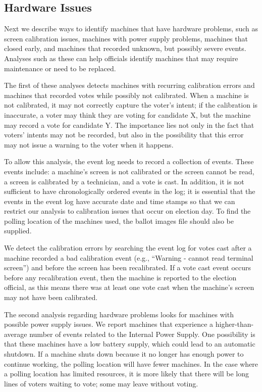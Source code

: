 \subsection{Hardware Issues}
\smvertspace
Next we describe ways to identify machines that have hardware problems, such as
screen calibration issues, machines with power supply problems, machines that
closed early, and machines that recorded unknown, but possibly severe events.
Analyses such as these can help officials identify machines that may require
maintenance or need to be replaced.  

The first of these analyses detects machines with recurring calibration errors
and machines that recorded votes while possibly not calibrated.  When
a machine is not calibrated, it may not
correctly capture the voter's intent; if the calibration is inaccurate, a voter
may think they are voting for candidate X, but the machine may record a vote for
candidate Y.  The importance lies not only in the fact that voters' intents may
not be recorded, but also in the possibility that this error may not issue a
warning to the voter when it happens.   

To allow this analysis, the event log needs to record a collection of
events. These events include: a machine's screen is not calibrated or
the screen cannot be read, a screen is calibrated by a technician, and
a vote is cast.  In addition, it is not sufficient to have
chronologically ordered events in the log; it is essential that the
events in the event log have accurate date and time stamps so that we can
restrict our analysis to calibration issues
that occur on election day.  To find the polling location of the
machines used, the ballot images file should also be supplied.  

We detect the calibration errors by searching the event log for votes cast after
a machine 
recorded a bad calibration event (e.g., ``Warning - cannot read terminal
screen'')  and before the screen has been recalibrated. If a vote cast event
occurs before any recalibration event,
then the machine is reported to the election official, as this means
there was at least one vote cast when the machine's screen may not
have been calibrated.  

The second analysis regarding hardware problems looks for machines with possible
power supply issues.  We report machines that experience a higher-than-average
number of events related to the Internal Power Supply. One possibility is that
these machines have a low battery supply, which could lead to an automatic
shutdown.  If a machine shuts down because it no longer has enough power to
continue working, the polling location will have fewer machines.  In the case
where a polling location has limited resources, it is more likely that there
will be long lines of voters waiting to vote; some may leave without voting.   

